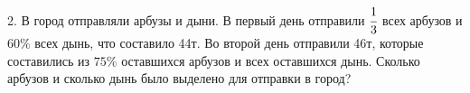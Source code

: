2. В город отправляли арбузы и дыни. В первый день отправили $\cfrac{1}{3}$ всех арбузов и $60\%$ всех дынь, что составило 44т. Во второй день отправили 46т, которые составились из $75\%$ оставшихся арбузов и всех оставшихся дынь. Сколько арбузов и сколько дынь было выделено для отправки в город?\\
